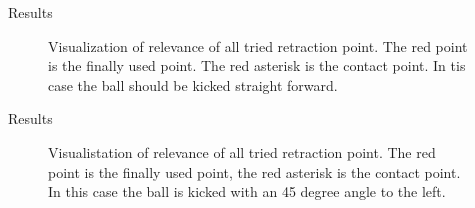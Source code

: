 \documentclass{beamer}
\begin{document}
\begin{frame}{Results}
\begin{figure}[htbp]
  \centering
  \caption{Visualization of relevance of all tried retraction point. The red
      point is the finally used point. The red asterisk is the contact point. In
      tis case the ball should be kicked straight forward.
         }
  \label{fig:retraction_plot1}
\end{figure}
\end{frame}

\begin{frame}{Results}

\begin{figure}[htbp]
  \centering
  \caption{Visualistation of relevance of all tried retraction point. The red
      point is the finally used point, the red asterisk is the contact point. 
      In this case the ball is kicked with an 45 degree angle to the left.
         }
  \label{fig:retraction_plot2}
\end{figure}
\end{frame}
\end{document}
